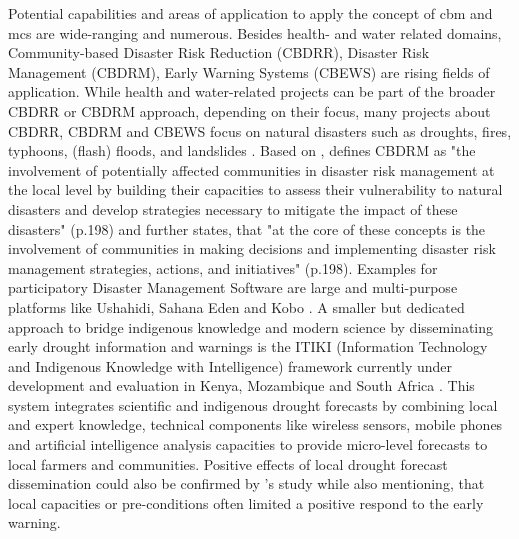 Potential capabilities and areas of application to apply the concept of \acrshort{cbm} and \acrshort{mcs} are wide-ranging and numerous. Besides health- and water related domains, Community-based Disaster Risk Reduction (CBDRR), Disaster Risk Management (CBDRM), Early Warning Systems (CBEWS) are rising fields of application. While health and water-related projects can be part of the broader CBDRR or CBDRM approach, depending on their focus, many projects about CBDRR, CBDRM and CBEWS focus on natural disasters such as droughts, fires, typhoons, (flash) floods, and landslides \autocite{machereraReviewStudiesCommunity2016,manaloBellBottleTechnology2013,pinedaRedefiningCommunityBased2015,smithCommunitybasedEarlyWarning2017,tarchianiCommunityImpactBased2020,trogrlicIndigenousKnowledgeEarly2018,vhumbunuCountingDayZero2021}. Based on \textcite{unisdrUNISDRTerminologyDisaster2009}, \textcite{vhumbunuCountingDayZero2021} defines CBDRM as "the involvement of potentially affected communities in disaster risk management at the local level by building their capacities to assess their vulnerability to natural disasters and develop strategies necessary to mitigate the impact of these disasters" (p.198) and further states, that "at the core of these concepts is the involvement of communities in making decisions and implementing disaster risk management strategies, actions, and initiatives" (p.198).\newline
Examples for participatory Disaster Management Software are large and multi-purpose platforms like Ushahidi, Sahana Eden and Kobo \autocite{koboorganizationKoboToolbox,sahanafoundationSahanaEDEN2016,ushahidiCrowdsourcingSolutionsEmpower}. A smaller but dedicated approach to bridge indigenous knowledge and modern science by disseminating early drought information and warnings is the ITIKI (Information Technology and Indigenous Knowledge with Intelligence) framework currently under development and evaluation in Kenya, Mozambique and South Africa \autocite{akanbiDevelopmentRuleBasedDrought2018,masindeEffectiveDroughtEarly2014a,masindeImplementationRoadmapDownscaling2013,masindeDownscalingAfricaDrought2018,masindeFrameworkPredictingDroughts2010a,masindeITIKIBridgeAfrican2012,masindeITIKIMobileBased2019,nyetanyaneIntegrationIndigenousKnowledge2020,thothelaSurveyIntelligentAgroclimate2021a}. This system integrates scientific and indigenous drought forecasts by combining local and expert knowledge, technical components like wireless sensors, mobile phones and artificial intelligence analysis capacities to provide micro-level forecasts to local farmers and communities. Positive effects of local drought forecast dissemination could also be confirmed by \textcite{anderssonLocalEarlyWarning2020}'s study while also mentioning, that local capacities or pre-conditions often limited a positive respond to the early warning.\newline
